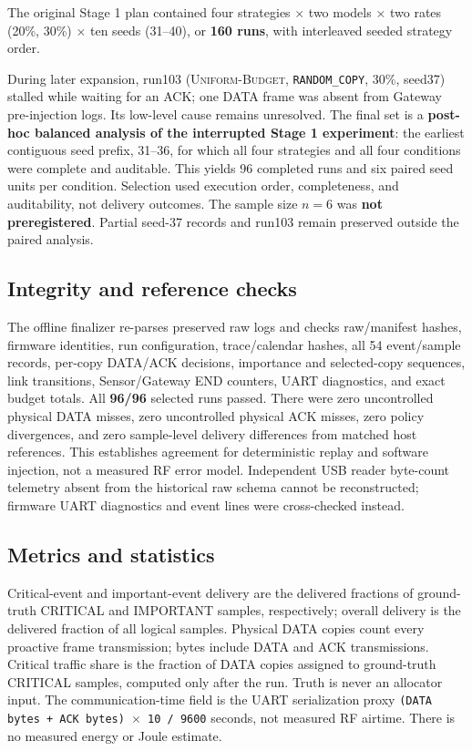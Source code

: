 \documentclass[11pt]{article}
\newcommand{\UB}{\textsc{Uniform-Budget}}
\begin{document}
The original Stage 1 plan contained four strategies \ensuremath{\times} two models \ensuremath{\times} two rates (20\%, 30\%) \ensuremath{\times} ten seeds (31--40), or \textbf{160 runs}, with interleaved seeded strategy order.

During later expansion, run103 (\UB{}, \texttt{RANDOM\_COPY}, 30\%, seed37) stalled while waiting for an ACK; one DATA frame was absent from Gateway pre-injection logs. Its low-level cause remains unresolved. The final set is a \textbf{post-hoc balanced analysis of the interrupted Stage 1 experiment}: the earliest contiguous seed prefix, 31--36, for which all four strategies and all four conditions were complete and auditable. This yields 96 completed runs and six paired seed units per condition. Selection used execution order, completeness, and auditability, not delivery outcomes. The sample size \(n=6\) was \textbf{not preregistered}. Partial seed-37 records and run103 remain preserved outside the paired analysis.

\subsection{Integrity and reference checks}\label{sec:integrity-and-reference-checks}

The offline finalizer re-parses preserved raw logs and checks raw/manifest hashes, firmware identities, run configuration, trace/calendar hashes, all 54 event/sample records, per-copy DATA/ACK decisions, importance and selected-copy sequences, link transitions, Sensor/Gateway END counters, UART diagnostics, and exact budget totals. All \textbf{96/96} selected runs passed. There were zero uncontrolled physical DATA misses, zero uncontrolled physical ACK misses, zero policy divergences, and zero sample-level delivery differences from matched host references. This establishes agreement for deterministic replay and software injection, not a measured RF error model. Independent USB reader byte-count telemetry absent from the historical raw schema cannot be reconstructed; firmware UART diagnostics and event lines were cross-checked instead.

\subsection{Metrics and statistics}\label{sec:metrics-and-statistics}

Critical-event and important-event delivery are the delivered fractions of ground-truth CRITICAL and IMPORTANT samples, respectively; overall delivery is the delivered fraction of all logical samples. Physical DATA copies count every proactive frame transmission; bytes include DATA and ACK transmissions. Critical traffic share is the fraction of DATA copies assigned to ground-truth CRITICAL samples, computed only after the run. Truth is never an allocator input. The communication-time field is the UART serialization proxy \texttt{(DATA bytes + ACK bytes) \ensuremath{\times} 10 / 9600} seconds, not measured RF airtime. There is no measured energy or Joule estimate.
\end{document}
